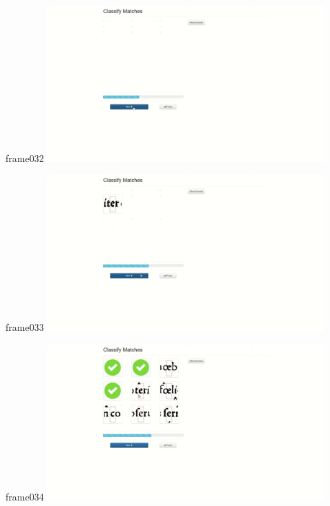 \documentclass{beamer}
\begin{document}
\begin{frame}{frame032}
\includegraphics[width=0.8\textwidth]{output/exported-frames/frame032.png}
\note{}
\end{frame}

\begin{frame}{frame033}
\includegraphics[width=0.8\textwidth]{output/exported-frames/frame033.png}
\note{}
\end{frame}

\begin{frame}{frame034}
\includegraphics[width=0.8\textwidth]{output/exported-frames/frame034.png}
\note{}
\end{frame}
\end{document}
